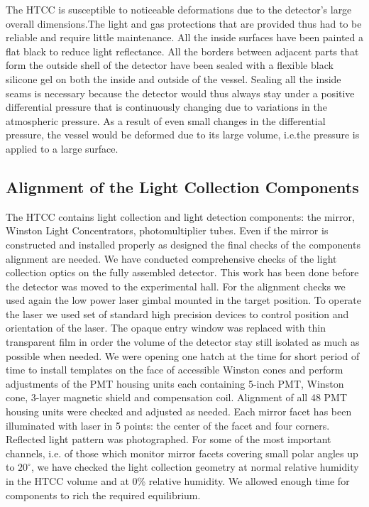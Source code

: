 \indent The HTCC is susceptible to noticeable deformations due to the detector's large overall dimensions.The light and gas protections that are provided thus had to be reliable and require little maintenance. All the inside surfaces have been painted a flat black to reduce light reflectance. All the borders between adjacent parts that form the outside shell of the detector have been sealed with a flexible black silicone gel on both the inside and outside of the vessel. Sealing all the inside seams is necessary because the detector would thus always stay under a positive differential pressure that is continuously changing due to variations in the atmospheric pressure. As a result of even small changes in the differential pressure, the vessel would be deformed due to its large volume, i.e.the pressure is applied to a large surface. 

\subsection{Alignment of the Light Collection Components}
The HTCC contains light collection and light detection components: the mirror, Winston Light Concentrators, photomultiplier tubes. Even if the mirror is constructed and installed properly as designed the final checks of the components alignment are needed. We have conducted comprehensive checks of the light collection optics on the fully assembled detector. This work has been done before the detector was moved to the experimental hall. For the alignment checks we used again the low power laser gimbal mounted in the target position. To operate the laser we used set of standard high precision devices to control position and orientation of the laser. The opaque entry window was replaced with thin transparent film in order the volume of the detector stay still isolated as much as possible when needed. We were opening one hatch at the time for short period of time to install templates on the face of accessible Winston cones and perform adjustments of the PMT housing units each containing 5-inch PMT, Winston cone, 3-layer magnetic shield and compensation coil. Alignment of all 48 PMT housing units were checked and adjusted as needed. Each mirror facet has been illuminated with laser in 5 points: the center of the facet and four corners. Reflected light  pattern was photographed. For some of the most important channels, i.e. of those which monitor mirror facets covering small polar angles up to $20^\circ$, we have checked the light collection geometry at normal relative humidity in the HTCC volume and at 0\% relative humidity. We allowed enough time for components to rich the required equilibrium.

